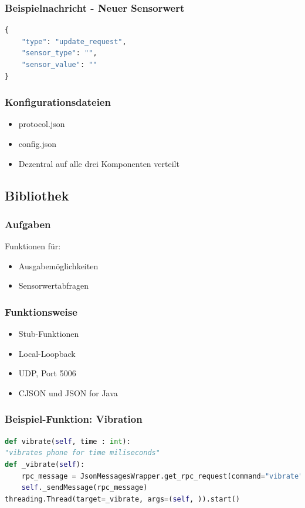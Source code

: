 \documentclass{beamer}
\begin{document}
\begin{frame}[fragile]
    \frametitle{Beispielnachricht - Neuer Sensorwert}
    \begin{lstlisting}[language=python]
{
    "type": "update_request",
    "sensor_type": "",
    "sensor_value": ""
}
\end{lstlisting}
\end{frame}

\begin{frame}
    \frametitle[]{Konfigurationsdateien}
    \begin{itemize}
        \item protocol.json
        \item config.json
        \item Dezentral auf alle drei Komponenten verteilt
    \end{itemize}
\end{frame}

\subsection{Bibliothek}

\begin{frame}
    \frametitle{Aufgaben}
    Funktionen für:
    \begin{itemize}
        \item Ausgabemöglichkeiten
        \item Sensorwertabfragen
    \end{itemize}
\end{frame}

\begin{frame}
    \frametitle[]{Funktionsweise}
    \begin{itemize}
        \item Stub-Funktionen
        \item Local-Loopback
        \item UDP, Port 5006
        \item CJSON und JSON for Java
    \end{itemize}
\end{frame}

\begin{frame}[fragile]
    \frametitle{Beispiel-Funktion: Vibration}
    \begin{lstlisting}[language=python]
def vibrate(self, time : int):
"vibrates phone for time miliseconds"
def _vibrate(self):
    rpc_message = JsonMessagesWrapper.get_rpc_request(command="vibrate", value=str(time))
    self._sendMessage(rpc_message)
threading.Thread(target=_vibrate, args=(self, )).start()
    \end{lstlisting}
\end{frame}
\end{document}
